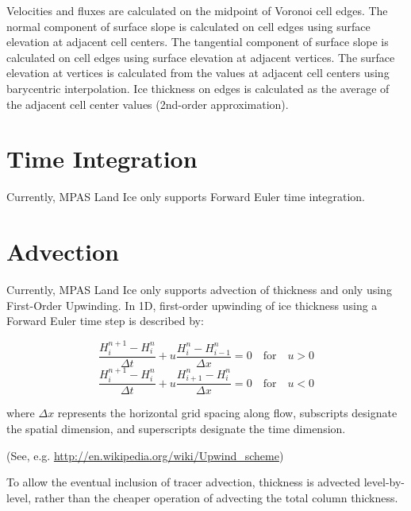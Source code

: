 Velocities and fluxes are calculated on the midpoint of Voronoi cell edges.  
The normal component of surface slope is calculated on cell edges 
using surface elevation at adjacent cell centers.  
The tangential component of surface slope is calculated on cell edges using 
surface elevation at adjacent vertices.  
The surface elevation at vertices is calculated from the values at adjacent 
cell centers using barycentric interpolation.
Ice thickness on edges is calculated as the average of the 
adjacent cell center values (2nd-order approximation).


\section{Time Integration}

Currently, MPAS Land Ice only supports Forward Euler time integration.


\section{Advection}

Currently, MPAS Land Ice only supports advection of thickness and only using First-Order Upwinding. 
In 1D, first-order upwinding of ice thickness using a Forward Euler time step is described by:

\begin{equation}
    \label{fouw}
 \frac{H_i^{n+1} - H_i^n}{\Delta t} + u \frac{H_i^n - H_{i-1}^n}{\Delta x} = 0 \quad \text{for} \quad u > 0
\end{equation}
\begin{equation}
 \frac{H_i^{n+1} - H_i^n}{\Delta t} + u \frac{H_{i+1}^n - H_i^n}{\Delta x} = 0 \quad \text{for} \quad u < 0
\end{equation}

where ${\Delta x}$ represents the horizontal grid spacing along flow, subscripts designate the spatial dimension, and superscripts designate the time dimension.

(See, e.g. \url{http://en.wikipedia.org/wiki/Upwind\_scheme})

To allow the eventual inclusion of tracer advection, thickness is advected level-by-level, rather than the cheaper operation of advecting the total column thickness.


